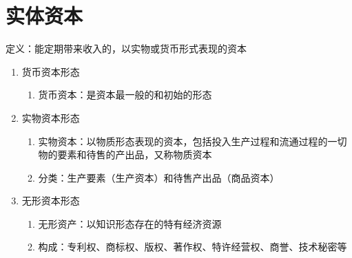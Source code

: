 \documentclass[12pt]{book}
\begin{document}



\section{实体资本}

定义：能定期带来收入的，以实物或货币形式表现的资本
\\

\begin{enumerate}[1.]
    \item 货币资本形态
          \begin{enumerate}[(1)]
              \item 货币资本：是资本最一般的和初始的形态
          \end{enumerate}
    \item 实物资本形态
          \begin{enumerate}[(1)]
              \item 实物资本：以物质形态表现的资本，包括投入生产过程和流通过程的一切物的要素和待售的产出品，又称物质资本
              \item 分类：生产要素（生产资本）和待售产出品（商品资本）
          \end{enumerate}
    \item 无形资本形态
          \begin{enumerate}[(1)]
              \item 无形资产：以知识形态存在的特有经济资源
              \item 构成：专利权、商标权、版权、著作权、特许经营权、商誉、技术秘密等
          \end{enumerate}

\end{enumerate}
\end{document}
